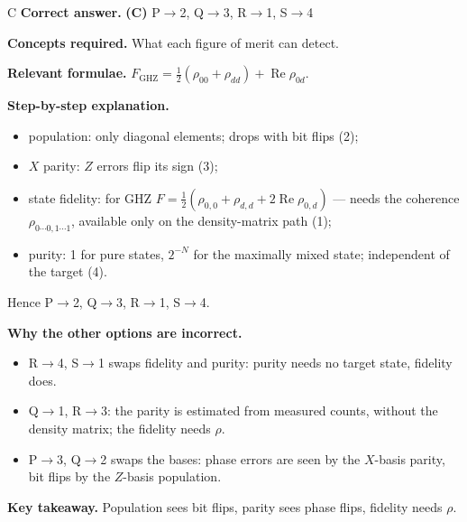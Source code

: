 \documentclass[11pt,a4paper]{article}
\newcommand{\qsep}{\par\vspace{2pt}{\color{black!15}\hrule}\vspace{4pt}}
\begin{document}
\begin{solbox}{C}
\textbf{\color{brand}Correct answer.} \textcolor{okgreen}{\textbf{(C)}} P$\to$2, Q$\to$3, R$\to$1, S$\to$4

\textbf{\color{brand}Concepts required.} What each figure of merit can detect.

\textbf{\color{brand}Relevant formulae.} $F_{\mathrm{GHZ}} = \frac12(\rho_{00} + \rho_{dd}) + \operatorname{Re}\rho_{0d}$.

\textbf{\color{brand}Step-by-step explanation.} \begin{itemize}\itemsep0pt
\item population: only diagonal elements; drops with bit flips (2);
\item $X$ parity: $Z$ errors flip its sign (3);
\item state fidelity: for GHZ $F = \frac12(\rho_{0,0} + \rho_{d,d} + 2\operatorname{Re}\rho_{0,d})$ --- needs the coherence $\rho_{0\cdots0,1\cdots1}$, available only on the density-matrix path (1);
\item purity: 1 for pure states, $2^{-N}$ for the maximally mixed state; independent of the target (4).
\end{itemize}
Hence P$\to$2, Q$\to$3, R$\to$1, S$\to$4.

\textbf{\color{brand}Why the other options are incorrect.}
\begin{itemize}[leftmargin=2.4em, itemsep=1pt, topsep=2pt]
\item[\textbf{(A)}] R$\to$4, S$\to$1 swaps fidelity and purity: purity needs no target state, fidelity does.
\item[\textbf{(B)}] Q$\to$1, R$\to$3: the parity is estimated from measured counts, without the density matrix; the fidelity needs $\rho$.
\item[\textbf{(D)}] P$\to$3, Q$\to$2 swaps the bases: phase errors are seen by the $X$-basis parity, bit flips by the $Z$-basis population.
\end{itemize}
\textbf{\color{brand}Key takeaway.} Population sees bit flips, parity sees phase flips, fidelity needs $\rho$.
\end{solbox}
\qsep
\end{document}

